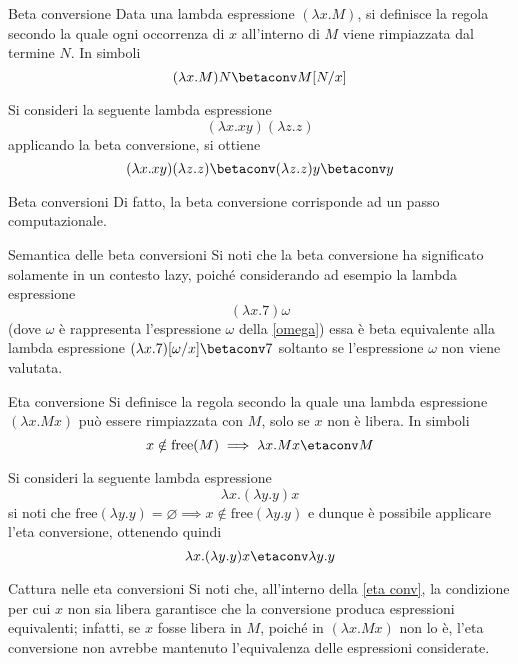 \documentclass[a4paper, 12pt]{report}
\begin{document}
    \begin{frameddefn}[label={beta conv}]{Beta conversione}
        Data una lambda espressione $(\lambda x.M)$, si definisce  la regola secondo la quale ogni occorrenza di $x$ all'interno di $M$ viene rimpiazzata dal termine $N$. In simboli $$(\lambda x.M)N \betaconv M[N/x]$$
    \end{frameddefn}

    \begin{example}
        Si consideri la seguente lambda espressione $$(\lambda x.xy)(\lambda z.z)$$ applicando la beta conversione, si ottiene $$(\lambda x.xy)(\lambda z.z) \betaconv (\lambda z.z)y \betaconv y$$
    \end{example}

    \begin{framedobs}{Beta conversioni}
        Di fatto, la beta conversione corrisponde ad un passo computazionale.
    \end{framedobs}

    \begin{framedobs}{Semantica delle beta conversioni}
        Si noti che la beta conversione ha significato solamente in un contesto lazy, poiché considerando ad esempio la lambda espressione $$(\lambda x.7) \omega$$ (dove $\omega$ è rappresenta l'espressione $\omega$ della \cref{omega}) essa è beta equivalente alla lambda espressione $(\lambda x.7)[\omega/x] \betaconv 7$ soltanto se l'espressione $\omega$ non viene valutata.
    \end{framedobs}

    \begin{frameddefn}[label={eta conv}]{Eta conversione}
        Si definisce  la regola secondo la quale una lambda espressione $(\lambda x.Mx)$ può essere rimpiazzata con $M$, solo se $x$ non è libera. In simboli $$x \notin \mathrm{free}(M) \implies \lambda x.Mx \etaconv M$$
    \end{frameddefn}

    \begin{example}
        Si consideri la seguente lambda espressione $$\lambda x.(\lambda y.y)x$$ si noti che $\mathrm{free}(\lambda y.y) = \varnothing \implies x \notin \mathrm{free}(\lambda y.y)$ e dunque è possibile applicare l'eta conversione, ottenendo quindi $$\lambda x .(\lambda y.y) x \etaconv \lambda y.y$$
    \end{example}

    \begin{framedobs}{Cattura nelle eta conversioni}
        Si noti che, all'interno della \cref{eta conv}, la condizione per cui $x$ non sia libera garantisce che la conversione produca espressioni equivalenti; infatti, se $x$ fosse libera in $M$, poiché in $(\lambda x.Mx)$ non lo è, l'eta conversione non avrebbe mantenuto l'equivalenza delle espressioni considerate.
    \end{framedobs}
\end{document}
